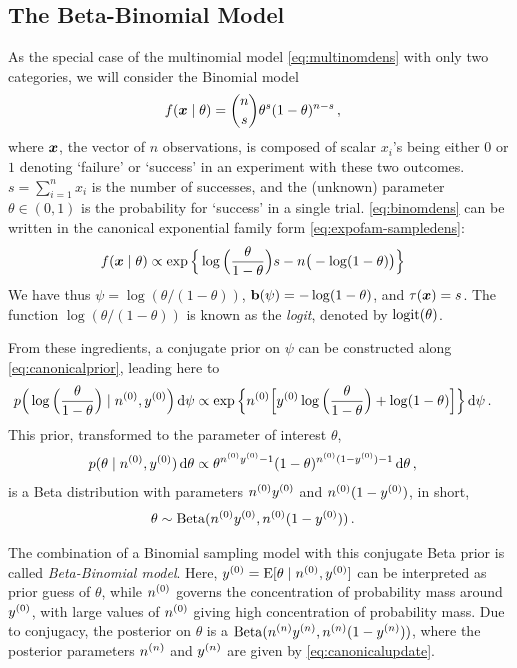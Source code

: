\subsection{The Beta-Binomial Model}
\label{sec:beta-binom}

As the special case of the multinomial model \eqref{eq:multinomdens} with only two categories, we will consider the Binomial model
\begin{align}
\label{eq:binomdens}
f({\bm x}\mid\theta) &= {n \choose s}\theta^s (1-\theta)^{n-s}\,,
\end{align}
where ${\bm x}$, the vector of $n$ observations, is composed of scalar $x_i$'s being either $0$ or $1$
denoting `failure' or `success' in an experiment with these two outcomes.
$s = \sum_{i=1}^n x_i$ is the number of successes,
and the (unknown) parameter $\theta \in (0,1)$ is the probability for `success' in a single trial.
\eqref{eq:binomdens} can be written in the canonical exponential family form \eqref{eq:expofam-sampledens}:
\begin{align*}
f({\bm x}\mid\theta) &\propto \exp\Big\{ \log\Big(\frac{\theta}{1-\theta}\Big) s - n \big(-\log(1-\theta)\big) \Big\}
\end{align*}
We have thus $\psi = \log(\theta/(1-\theta))$, $\mathbf{b}(\psi) = -\log(1-\theta)$, and $\tau({\bm x}) = s$.
The function $\log(\theta/(1-\theta))$ is known as the \emph{logit}, denoted by $\operatorname{logit}(\theta)$.

From these ingredients, a conjugate prior on $\psi$ can be constructed along \eqref{eq:canonicalprior},
leading here to
\begin{align*}
p\Big(\log\Big(\frac{\theta}{1-\theta}\Big) \mid \nz, \yz\Big) \dd\psi %
 &\propto \exp\Big\{ \nz \Big[ \yz \log\Big(\frac{\theta}{1-\theta}\Big) + \log(1-\theta) \Big] \Big\} \dd\psi\,.
\end{align*}
This prior, transformed to the parameter of interest $\theta$,
\begin{align*}
p(\theta\mid n^{(0)}, y^{(0)})\,\mathrm{d}\theta &\propto \theta^{n^{(0)}y^{(0)} - 1} (1-\theta)^{n^{(0)}(1-y^{(0)}) - 1} \,\mathrm{d}\theta\,,
\end{align*}
is a Beta distribution with parameters $n^{(0)}y^{(0)}$ and $n^{(0)}(1-y^{(0)})$, in short, %
\begin{align*}
\theta &\sim \operatorname{Beta}(n^{(0)}y^{(0)}, n^{(0)}(1-y^{(0)}))\,.
\end{align*}

The combination of a Binomial sampling model with this conjugate Beta prior is called \emph{Beta-Binomial model}.
Here, $y^{(0)} = \operatorname{E}[\theta\mid n^{(0)}, y^{(0)}]$ can be interpreted as prior guess of $\theta$,
while $n^{(0)}$ governs the concentration of probability mass around $y^{(0)}$,
with large values of $n^{(0)}$ giving high concentration of probability mass.
Due to conjugacy, the posterior on $\theta$ is a $\operatorname{Beta}(n^{(n)}y^{(n)}, n^{(n)}(1-y^{(n)}))$,
where the posterior parameters $n^{(n)}$ and $y^{(n)}$ are given by \eqref{eq:canonicalupdate}.

